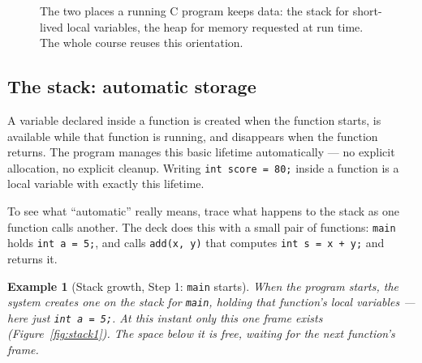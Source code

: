 \documentclass[11pt]{article}
\newtheorem{example}{Example}[section]
\begin{document}
\begin{figure}[h]
  \centering
  \caption{The two places a running C program keeps data: the stack for
  short-lived local variables, the heap for memory requested at run time. The
  whole course reuses this orientation.}
  \label{fig:two-places}
\end{figure}

\subsection{The stack: automatic storage}

A variable declared inside a function is created when the function starts, is
available while that function is running, and disappears when the function
returns. The program manages this basic lifetime automatically --- no explicit
allocation, no explicit cleanup. Writing \texttt{int score = 80;} inside a
function is a local variable with exactly this lifetime.

To see what ``automatic'' really means, trace what happens to the stack as one
function calls another. The deck does this with a small pair of functions:
\texttt{main} holds \texttt{int a = 5;}, and calls \texttt{add(x, y)} that
computes \texttt{int s = x + y;} and returns it.

\begin{example}[Stack growth, Step 1: \texttt{main} starts]
When the program starts, the system creates one  on the stack for
\texttt{main}, holding that function's local variables --- here just
\texttt{int a = 5;}. At this instant only this one frame exists
(Figure~\ref{fig:stack1}). The space below it is free, waiting for the next
function's frame.
\end{example}
\end{document}

